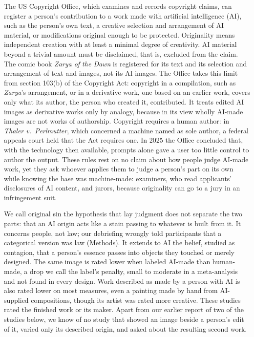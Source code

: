 The US Copyright Office, which examines and records copyright claims, can register a person's contribution to a work made with artificial intelligence (AI), such as the person's own text, a creative selection and arrangement of AI material, or modifications original enough to be protected.\cite{usco2023guidance,usco2025copyrightability} Originality means independent creation with at least a minimal degree of creativity.\cite{feist1991rural} AI material beyond a trivial amount must be disclaimed, that is, excluded from the claim.\cite{usco2023guidance,usco2023theatre} The comic book \emph{Zarya of the Dawn} is registered for its text and its selection and arrangement of text and images, not its AI images.\cite{usco2023zarya} The Office takes this limit from section 103(b) of the Copyright Act: copyright in a compilation, such as \emph{Zarya}'s arrangement, or in a derivative work, one based on an earlier work, covers only what its author, the person who created it, contributed.\cite{usco2023guidance,usc2024definitions,usc2024compilations} It treats edited AI images as derivative works only by analogy, because in its view wholly AI-made images are not works of authorship.\cite{usco2025copyrightability} Copyright requires a human author: in \emph{Thaler v.\ Perlmutter}, which concerned a machine named as sole author, a federal appeals court held that the Act requires one.\cite{thaler2025perlmutter,usco2025copyrightability} In 2025 the Office concluded that, with the technology then available, prompts alone gave a user too little control to author the output.\cite{usco2023guidance,usco2025copyrightability} These rules rest on no claim about how people judge AI-made work, yet they ask whoever applies them to judge a person's part on its own while knowing the base was machine-made: examiners, who read applicants' disclosures of AI content,\cite{usco2023guidance} and jurors, because originality can go to a jury in an infringement suit.\cite{eleventhcircuit2025pattern}

We call original sin the hypothesis that lay judgment does not separate the two parts: that an AI origin acts like a stain passing to whatever is built from it. It concerns people, not law; our debriefing wrongly told participants that a categorical version was law (Methods). It extends to AI the belief, studied as contagion, that a person's essence passes into objects they touched or merely designed.\cite{newman2011celebrity,stavrova2016contamination} The same image is rated lower when labeled AI-made than human-made,\cite{bellaiche2023humans,horton2023bias,millet2023defending} a drop we call the label's penalty, small to moderate in a meta-analysis\cite{derooij2025bias} and not found in every design.\cite{neef2025drawing,messingschlager2025mind} Work described as made by a person with AI is also rated lower on most measures, even a painting made by hand from AI-supplied compositions, though its artist was rated more creative.\cite{horton2023bias,messer2024cocreating} These studies rated the finished work or its maker. Apart from our earlier report of two of the studies below,\cite{kamper2025originalsin} we know of no study that showed an image beside a person's edit of it, varied only its described origin, and asked about the resulting second work.

